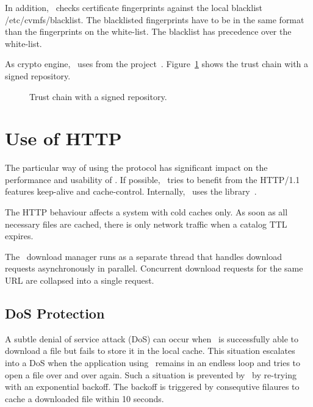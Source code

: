 In addition, \cvmfs\ checks certificate fingerprints against the local blacklist /etc/cvmfs/blacklist.
The blacklisted fingerprints have to be in the same format than the fingerprints on the white-list.
The blacklist has precedence over the white-list.

As crypto engine, \cvmfs\ uses  from the  project~\cite{openssl}.
Figure~\ref{fig:security} shows the trust chain with a signed repository.
\begin{figure}
	\begin{center}
		
	\end{center}
	\caption{Trust chain with a signed repository.}
	\label{fig:security}
\end{figure}



\pagebreak
\section{Use of HTTP}
The particular way of using the  protocol has significant impact on the performance and usability of \cvmfs.
If possible, \cvmfs\ tries to benefit from the HTTP/1.1 features keep-alive and cache-control.
Internally, \cvmfs\ uses the  library~\cite{libcurl}.

The HTTP behaviour affects a system with cold caches only.
As soon as all necessary files are cached, there is only network traffic when a catalog TTL expires.

The \cvmfs\ download manager runs as a separate thread that handles download requests asynchronously in parallel.
Concurrent download requests for the same URL are collapsed into a single request.

\subsection{DoS Protection}
A subtle denial of service attack (DoS) can occur when \cvmfs\ is successfully able to download a file but fails to store it in the local cache.
This situation escalates into a DoS when the application using \cvmfs\ remains in an endless loop and tries to open a file over and over again.
Such a situation is prevented by \cvmfs\ by re-trying with an exponential backoff.
The backoff is triggered by consequtive filaures to cache a downloaded file within 10 seconds.

